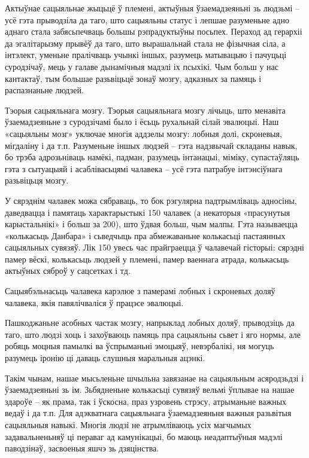 Актыўнае сацыяльнае жыцьцё ў племені, актыўныя ўзаемадзеяньні зь людзьмі – усё гэта прыводзіла да таго, што сацыяльны статус і лепшае разуменьне адно аднаго стала забясьпечваць большы рэпрадуктыўны посьпех. Пераход ад герархіі да эгалітарызму прывёў да таго, што вырашальнай стала не фізычная сіла, а інтэлект, уменьне пралічваць учынкі іншых, разумець матывацыю і пачуцьці суродзічаў, мець у галаве дынамічныя мадэлі іх псыхікі. Чым больш у нас кантактаў, тым большае разьвіцьцё зонаў мозгу, адказных за памяць і распазнаньне людзей.

Тэорыя сацыяльнага мозгу. Тэорыя сацыяльнага мозгу лічыць, што менавіта ўзаемадзеяньне з суродзічамі было і ёсьць рухальнай сілай эвалюцыі. Наш «сацыяльны мозг» уключае многія аддзелы мозгу: лобныя долі, скроневыя, мігдаліну і да т.п. Разуменьне іншых людзей – гэта надзвычай складаны навык, бо трэба адрозьніваць намёкі, падман, разумець інтанацыі, міміку, супастаўляць гэта з сытуацыяй і асаблівасьцямі чалавека – усё гэта патрабуе інтэнсіўнага разьвіцьця мозгу.

У сярэднім чалавек можа сябраваць, то бок рэгулярна падтрымліваць адносіны, даведвацца і памятаць характарыстыкі 150 чалавек (а некаторыя «прасунутыя карыстальнікі» і больш за 200), што ўдвая больш, чым малпы. Гэта называецца «колькасьць Данбара» і сьведчыць пра абмежаваньне колькасьці пастаянных сацыяльных сувязяў. Лік 150 увесь час прайграецца ў чалавечай гісторыі: сярэдні памер вёскі, колькасьць людзей у племені, памер ваеннага атрада, колькасьць актыўных сяброў у сацсетках і тд.

Сацыябэльнасьць чалавека карэлюе з памерамі лобных і скроневых доляў чалавека, якія павялічваліся ў працэсе эвалюцыі.

Пашкоджаньне асобных частак мозгу, напрыклад лобных доляў, прыводзіць да таго, што людзі хоць і захоўваюць памяць пра сацыяльны сьвет і яго нормы, але робяць моцныя памылкі ва ўспрыманьні эмоцыяў, невэрбалікі, ня могуць разумець іронію ці даваць слушныя маральныя ацэнкі.

Такім чынам, нашае мысьленьне шчыльна завязанае на сацыяльным асяродзьдзі і ўзаемадзеяньні зь ім. Зьбядненьне колькасьці сувязяў вельмі ўплывае на нашае здароўе – як прама, так і ўскосна, праз узровень стрэсу, атрыманьне важных ведаў і да т.п. Для адэкватнага сацыяльнага ўзаемадзеяньня важныя разьвітыя сацыяльныя навыкі. Многія людзі не атрымліваюць усіх магчымых задавальненьняў ці пераваг ад камунікацыі, бо маюць неадаптыўныя мадэлі паводзінаў, засвоеныя яшчэ зь дзяцінства. 

